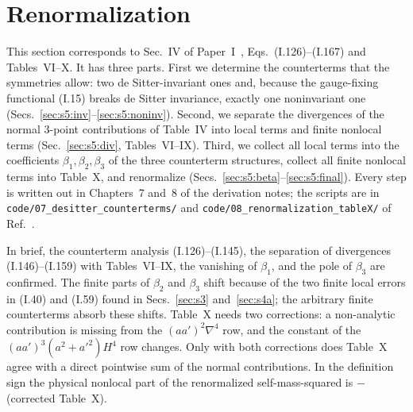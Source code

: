 \documentclass[aps,prd,onecolumn,10pt,nofootinbib,floatfix]{revtex4-2}
\newcommand{\PI}{Paper~I}
\newcommand{\eqI}[1]{(I.#1)}
\begin{document}
\providecommand{\sfiveRes}{\operatorname{Res}}
\providecommand{\sfiveLie}{\pounds}
\providecommand{\sfiveLGF}{\mathcal{L}_{\rm GF}}
\providecommand{\sfiveLy}{\mathcal{L}_y}
\providecommand{\sfiveCd}{C_{\delta}}
\providecommand{\sfivegE}{\gamma_{\rm E}}
\providecommand{\sfivekb}{\bar k}

\section{Renormalization}
\label{sec:s5}

This section corresponds to Sec.~IV of \PI~\cite{KW07}, Eqs.~\eqI{126}--\eqI{167} and Tables~VI--X.
It has three parts.
First we determine the counterterms that the symmetries allow: two de Sitter-invariant ones and, because the gauge-fixing functional \eqI{15} breaks de Sitter invariance, exactly one noninvariant one (Secs.~\ref{sec:s5:inv}--\ref{sec:s5:noninv}).
Second, we separate the divergences of the normal 3-point contributions of Table~IV into local terms and finite nonlocal terms (Sec.~\ref{sec:s5:div}, Tables~VI--IX).
Third, we collect all local terms into the coefficients $\beta_1,\beta_2,\beta_3$ of the three counterterm structures, collect all finite nonlocal terms into Table~X, and renormalize (Secs.~\ref{sec:s5:beta}--\ref{sec:s5:final}).
Every step is written out in Chapters~7 and~8 of the derivation notes; the scripts are in \texttt{code/07\_desitter\_counterterms/} and \texttt{code/08\_renormalization\_tableX/} of Ref.~\cite{ref:repo}.

In brief, the counterterm analysis \eqI{126}--\eqI{145}, the separation of divergences \eqI{146}--\eqI{159} with Tables~VI--IX, the vanishing of $\beta_1$, and the pole of $\beta_3$ are confirmed.
The finite parts of $\beta_2$ and $\beta_3$ shift because of the two finite local errors in \eqI{40} and \eqI{59} found in Secs.~\ref{sec:s3} and~\ref{sec:s4a}; the arbitrary finite counterterms absorb these shifts.
Table~X needs two corrections: a non-analytic contribution is missing from the $(aa')^2\nabla^4$ row, and the constant of the $(aa')^3(a^2+a'^2)H^4$ row changes.
Only with both corrections does Table~X agree with a direct pointwise sum of the normal contributions.
In the definition sign the physical nonlocal part of the renormalized self-mass-squared is $-$(corrected Table~X).
\end{document}

